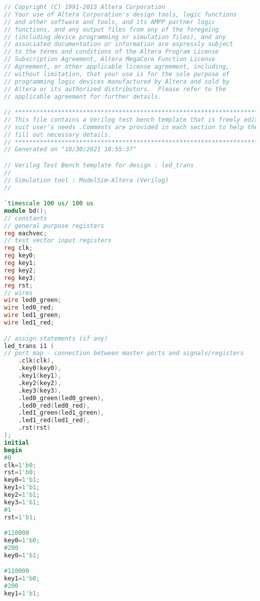 \documentclass[12pt,AutoFakeBold]{article}
\begin{document}
\begin{lstlisting}[language=Verilog]
// Copyright (C) 1991-2013 Altera Corporation
// Your use of Altera Corporation's design tools, logic functions 
// and other software and tools, and its AMPP partner logic 
// functions, and any output files from any of the foregoing 
// (including device programming or simulation files), and any 
// associated documentation or information are expressly subject 
// to the terms and conditions of the Altera Program License 
// Subscription Agreement, Altera MegaCore Function License 
// Agreement, or other applicable license agreement, including, 
// without limitation, that your use is for the sole purpose of 
// programming logic devices manufactured by Altera and sold by 
// Altera or its authorized distributors.  Please refer to the 
// applicable agreement for further details.

// ***********************************************************************
// This file contains a Verilog test bench template that is freely editable to  
// suit user's needs .Comments are provided in each section to help the user    
// fill out necessary details.                                                  
// ***********************************************************************
// Generated on "10/30/2021 10:55:37"

// Verilog Test Bench template for design : led_trans
// 
// Simulation tool : ModelSim-Altera (Verilog)
// 

`timescale 100 us/ 100 us
module bd();
// constants                                           
// general purpose registers
reg eachvec;
// test vector input registers
reg clk;
reg key0;
reg key1;
reg key2;
reg key3;
reg rst;
// wires                                               
wire led0_green;
wire led0_red;
wire led1_green;
wire led1_red;

// assign statements (if any)                          
led_trans i1 (
// port map - connection between master ports and signals/registers   
	.clk(clk),
	.key0(key0),
	.key1(key1),
	.key2(key2),
	.key3(key3),
	.led0_green(led0_green),
	.led0_red(led0_red),
	.led1_green(led1_green),
	.led1_red(led1_red),
	.rst(rst)
);
initial                                                
begin                                             
#0                         
clk=1'b0;
rst=1'b0;
key0=1'b1;
key1=1'b1;
key2=1'b1;
key3=1'b1;
#1
rst=1'b1;

#110000
key0=1'b0;
#200
key0=1'b1;

#110000
key1=1'b0;
#200
key1=1'b1;


\end{lstlisting}
\end{document}
